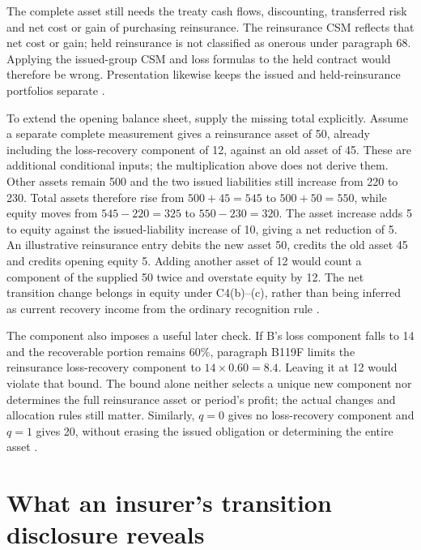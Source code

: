The complete asset still needs the treaty cash flows, discounting, transferred
risk and net cost or gain of purchasing reinsurance. The reinsurance CSM
reflects that net cost or gain; held reinsurance is not classified as onerous
under paragraph 68. Applying the issued-group CSM and loss formulas to the
held contract would therefore be wrong. Presentation likewise keeps the
issued and held-reinsurance portfolios separate
\citep[paragraphs 65--68 and 78--79]{aasb17}.

\clearpage
To extend the opening balance sheet, supply the missing total explicitly.
Assume a separate complete measurement gives a reinsurance asset of 50,
already including the loss-recovery component of 12, against an old asset of
45. These are additional conditional inputs; the multiplication above does
not derive them. Other assets remain 500 and the two issued liabilities still
increase from 220 to 230. Total assets therefore rise from $500+45=545$ to
$500+50=550$, while equity moves from $545-220=325$ to $550-230=320$.
The asset increase adds 5 to equity against the issued-liability increase
of 10, giving a net reduction of 5. An illustrative reinsurance entry debits
the new asset 50, credits the old asset 45 and credits opening equity 5.
Adding another asset of 12 would count a component of the supplied 50 twice
and overstate equity by 12. The net transition change belongs in equity
under C4(b)--(c), rather than being inferred as current recovery income
from the ordinary recognition rule \citep[paragraphs C4--C5 and C20A]{aasb17}.

The component also imposes a useful later check. If B's loss component falls
to 14 and the recoverable portion remains 60\%, paragraph B119F limits the
reinsurance loss-recovery component to $14\times0.60=8.4$. Leaving it at 12
would violate that bound. The bound alone neither selects a unique new
component nor determines the full reinsurance asset or period's profit;
the actual changes and allocation rules still matter. Similarly, $q=0$
gives no loss-recovery component and $q=1$ gives 20, without erasing the
issued obligation or determining the entire asset
\citep[paragraphs 66--67 and B119F]{aasb17}.

\clearpage
\hypertarget{munich-re-transition-disclosure}{%
\section{What an insurer's transition disclosure reveals}\label{method-insurance-munich-transition}}

